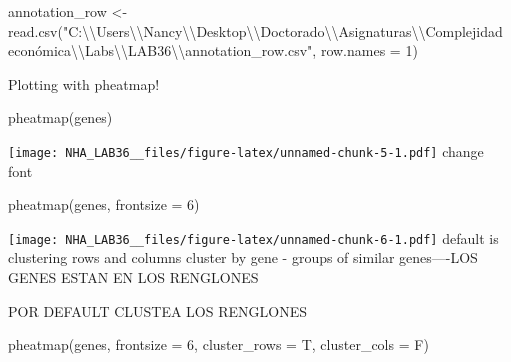 \documentclass[
]{article}
\newenvironment{Shaded}{\begin{snugshade}}{\end{snugshade}}
\newcommand{\AttributeTok}[1]{\textcolor[rgb]{0.77,0.63,0.00}{#1}}
\newcommand{\DecValTok}[1]{\textcolor[rgb]{0.00,0.00,0.81}{#1}}
\newcommand{\FunctionTok}[1]{\textcolor[rgb]{0.00,0.00,0.00}{#1}}
\newcommand{\NormalTok}[1]{#1}
\newcommand{\OtherTok}[1]{\textcolor[rgb]{0.56,0.35,0.01}{#1}}
\newcommand{\SpecialCharTok}[1]{\textcolor[rgb]{0.00,0.00,0.00}{#1}}
\newcommand{\StringTok}[1]{\textcolor[rgb]{0.31,0.60,0.02}{#1}}
\begin{document}
\begin{Shaded}
\begin{Highlighting}[]
\NormalTok{annotation\_row }\OtherTok{\textless{}{-}} \FunctionTok{read.csv}\NormalTok{(}\StringTok{"C:}\SpecialCharTok{\textbackslash{}\textbackslash{}}\StringTok{Users}\SpecialCharTok{\textbackslash{}\textbackslash{}}\StringTok{Nancy}\SpecialCharTok{\textbackslash{}\textbackslash{}}\StringTok{Desktop}\SpecialCharTok{\textbackslash{}\textbackslash{}}\StringTok{Doctorado}\SpecialCharTok{\textbackslash{}\textbackslash{}}\StringTok{Asignaturas}\SpecialCharTok{\textbackslash{}\textbackslash{}}\StringTok{Complejidad económica}\SpecialCharTok{\textbackslash{}\textbackslash{}}\StringTok{Labs}\SpecialCharTok{\textbackslash{}\textbackslash{}}\StringTok{LAB36}\SpecialCharTok{\textbackslash{}\textbackslash{}}\StringTok{annotation\_row.csv"}\NormalTok{,}
                           \AttributeTok{row.names =} \DecValTok{1}\NormalTok{)}
\end{Highlighting}
\end{Shaded}

Plotting with pheatmap!

\begin{Shaded}
\begin{Highlighting}[]
\FunctionTok{pheatmap}\NormalTok{(genes)}
\end{Highlighting}
\end{Shaded}

\texttt{[image: NHA\_LAB36\_\_files/figure-latex/unnamed-chunk-5-1.pdf]}
change font

\begin{Shaded}
\begin{Highlighting}[]
\FunctionTok{pheatmap}\NormalTok{(genes, }\AttributeTok{frontsize =} \DecValTok{6}\NormalTok{)}
\end{Highlighting}
\end{Shaded}

\texttt{[image: NHA\_LAB36\_\_files/figure-latex/unnamed-chunk-6-1.pdf]}
default is clustering rows and columns cluster by gene - groups of
similar genes----LOS GENES ESTAN EN LOS RENGLONES

POR DEFAULT CLUSTEA LOS RENGLONES

\begin{Shaded}
\begin{Highlighting}[]
\FunctionTok{pheatmap}\NormalTok{(genes, }\AttributeTok{frontsize =} \DecValTok{6}\NormalTok{, }\AttributeTok{cluster\_rows =}\NormalTok{ T, }\AttributeTok{cluster\_cols =}\NormalTok{ F)}
\end{Highlighting}
\end{Shaded}
\end{document}
